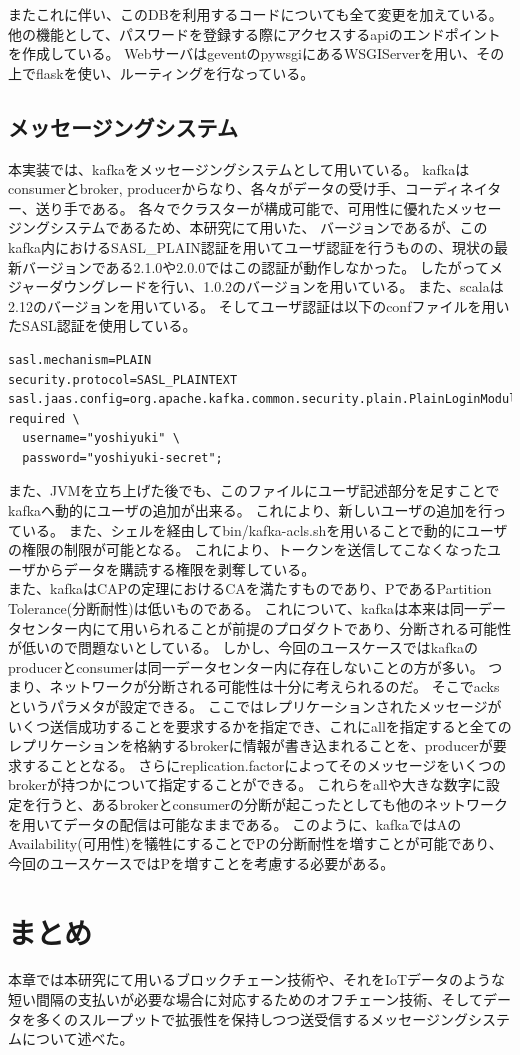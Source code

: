 またこれに伴い、このDBを利用するコードについても全て変更を加えている。
他の機能として、パスワードを登録する際にアクセスするapiのエンドポイントを作成している。
WebサーバはgeventのpywsgiにあるWSGIServerを用い、その上でflaskを使い、ルーティングを行なっている。

\subsection{メッセージングシステム}
本実装では、kafkaをメッセージングシステムとして用いている。
kafkaはconsumerとbroker, producerからなり、各々がデータの受け手、コーディネイター、送り手である。
各々でクラスターが構成可能で、可用性に優れたメッセージングシステムであるため、本研究にて用いた、
バージョンであるが、このkafka内におけるSASL\_PLAIN認証を用いてユーザ認証を行うものの、現状の最新バージョンである2.1.0や2.0.0ではこの認証が動作しなかった。
したがってメジャーダウングレードを行い、1.0.2のバージョンを用いている。
また、scalaは2.12のバージョンを用いている。
そしてユーザ認証は以下のconfファイルを用いたSASL認証を使用している。
\begin{lstlisting}[caption=SASL認証の設定 config/producer.properties  ,label=serverProperties]
sasl.mechanism=PLAIN
security.protocol=SASL_PLAINTEXT
sasl.jaas.config=org.apache.kafka.common.security.plain.PlainLoginModule required \
  username="yoshiyuki" \
  password="yoshiyuki-secret";
\end{lstlisting}
また、JVMを立ち上げた後でも、このファイルにユーザ記述部分を足すことでkafkaへ動的にユーザの追加が出来る。
これにより、新しいユーザの追加を行っている。
また、シェルを経由してbin/kafka-acls.shを用いることで動的にユーザの権限の制限が可能となる。
これにより、トークンを送信してこなくなったユーザからデータを購読する権限を剥奪している。 \\
また、kafkaはCAPの定理におけるCAを満たすものであり、PであるPartition Tolerance(分断耐性)は低いものである。
これについて、kafkaは本来は同一データセンター内にて用いられることが前提のプロダクトであり、分断される可能性が低いので問題ないとしている。
しかし、今回のユースケースではkafkaのproducerとconsumerは同一データセンター内に存在しないことの方が多い。
つまり、ネットワークが分断される可能性は十分に考えられるのだ。
そこでacksというパラメタが設定できる。
ここではレプリケーションされたメッセージがいくつ送信成功することを要求するかを指定でき、これにallを指定すると全てのレプリケーションを格納するbrokerに情報が書き込まれることを、producerが要求することとなる。
さらにreplication.factorによってそのメッセージをいくつのbrokerが持つかについて指定することができる。
これらをallや大きな数字に設定を行うと、あるbrokerとconsumerの分断が起こったとしても他のネットワークを用いてデータの配信は可能なままである。
このように、kafkaではAのAvailability(可用性)を犠牲にすることでPの分断耐性を増すことが可能であり、今回のユースケースではPを増すことを考慮する必要がある。

\section{まとめ}
本章では本研究にて用いるブロックチェーン技術や、それをIoTデータのような短い間隔の支払いが必要な場合に対応するためのオフチェーン技術、そしてデータを多くのスループットで拡張性を保持しつつ送受信するメッセージングシステムについて述べた。